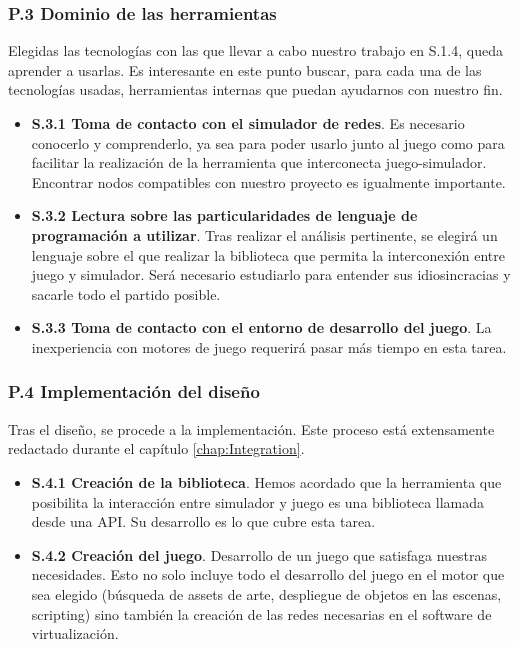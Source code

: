\subsubsection{P.3 Dominio de las herramientas}
Elegidas las tecnologías con las que llevar a cabo nuestro trabajo en S.1.4, queda aprender a usarlas. Es interesante en este punto buscar, para cada una de las tecnologías usadas, herramientas internas que puedan ayudarnos con nuestro fin.
\begin{itemize}
\item \textbf{S.3.1 Toma de contacto con el simulador de redes}. Es necesario conocerlo y comprenderlo, ya sea para poder usarlo junto al juego como para facilitar la realización de la herramienta que interconecta juego-simulador. Encontrar nodos compatibles con nuestro proyecto es igualmente importante.
\item \textbf{S.3.2 Lectura sobre las particularidades de lenguaje de programación a utilizar}. Tras realizar el análisis pertinente, se elegirá un lenguaje sobre el que realizar la biblioteca que permita la interconexión entre juego y simulador. Será necesario estudiarlo para entender sus idiosincracias y sacarle todo el partido posible.
\item \textbf{S.3.3 Toma de contacto con el entorno de desarrollo del juego}. La inexperiencia con motores de juego requerirá pasar más tiempo en esta tarea.
\end{itemize}

\subsubsection{P.4 Implementación del diseño}
Tras el diseño, se procede a la implementación. Este proceso está extensamente redactado durante el capítulo \ref{chap:Integration}.
\begin{itemize}
\item \textbf{S.4.1 Creación de la biblioteca}. Hemos acordado que la herramienta que posibilita la interacción entre simulador y juego es una biblioteca llamada desde una API. Su desarrollo es lo que cubre esta tarea. 
\item \textbf{S.4.2 Creación del juego}. Desarrollo de un juego que satisfaga nuestras necesidades. Esto no solo incluye todo el desarrollo del juego en el motor que sea elegido (búsqueda de assets de arte, despliegue de objetos en las escenas, scripting) sino también la creación de las redes necesarias en el software de virtualización.
\end{itemize}

